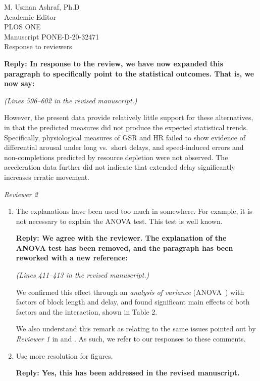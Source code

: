 \documentclass[10pt, letterpaper]{letter}
\newenvironment{QandA}
{\begin{enumerate}[
    label={\bfseries Comment \arabic*:}, 
    wide,
    ref={Comment \arabic*}]}
{\end{enumerate}}
\newenvironment{revised}[2]
{%
\begin{displayquote}
    \medskip
    \begin{flushright}
        \itshape{(Lines \numrange{#1}{#2} in the revised manuscript.)}\normalfont%
    \end{flushright}
    \medskip

}
{\end{displayquote}}
\newenvironment{answered}
{\medskip\par\bfseries Reply: \normalfont}
{\par\noindent\makebox[\linewidth]{\rule{\textwidth}{0.4pt}}\bigskip}
\begin{document}
\begin{letter}{
    M. Usman Ashraf, Ph.D\\
    Academic Editor\\
    PLOS ONE\\
    \medskip
    Manuscript PONE-D-20-32471\\
    Response to reviewers\\
}
\begin{QandA}
\begin{answered}
        In response to the review, we have now expanded this paragraph to specifically point to the statistical outcomes.
        That is, we now say:

        \begin{revised}{596}{602}
            However, the present data provide relatively little support for these alternatives, in that the predicted measures did not produce the expected statistical trends.
            Specifically, physiological measures of GSR and HR failed to show evidence of differential arousal under long vs.\ short delays, and speed-induced errors and non-completions predicted by resource depletion were not observed.
            The acceleration data further did not indicate that extended delay significantly increases erratic movement.
        \end{revised}
    \end{answered}
    
\end{QandA}

\textit{Reviewer 2}
\begin{QandA}
    \item The explanations have been used too much in somewhere.
    For example, it is not necessary to explain the ANOVA test.
    This test is well known.

    \begin{answered}
        We agree with the reviewer.
        The explanation of the ANOVA test has been removed, and the paragraph has been reworked with a new reference:

        \begin{revised}{411}{413}
            We confirmed this effect through an \emph{analysis of variance} (ANOVA~\autocite{FUJIKOSHI1993ANOVA}) with factors of block length and delay, and found significant main effects of both factors and the interaction, shown in Table 2.
        \end{revised}
        
        We also understand this remark as relating to the same issues pointed out by \emph{Reviewer 1} in  and .
        As such, we refer to our responses to these comments.
    \end{answered}

    \item Use more resolution for figures.
    
    \begin{answered}
        Yes, this has been addressed in the revised manuscript.
    \end{answered}


\end{QandA}
\end{letter}
\end{document}
